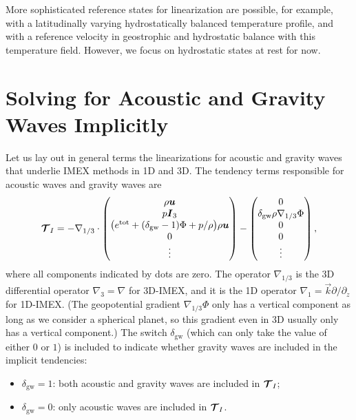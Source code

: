 \documentclass{report}
\begin{document}
More sophisticated reference states for linearization are possible, for example, with a latitudinally varying hydrostatically balanced temperature profile, and with a reference velocity in geostrophic and hydrostatic balance with this temperature field. However, we focus on hydrostatic states at rest for now. 
 
 \section{Solving for Acoustic and Gravity Waves Implicitly}
 \label{s:IMEX_general}

Let us lay out in general terms the linearizations for acoustic and gravity waves that underlie IMEX methods in 1D and 3D. The tendency terms responsible for acoustic waves and gravity waves are
 \begin{equation}
 \boldsymbol{{\mathcal{T}}}_{I}= -\nabla_{1/3} \cdot
 \begin{pmatrix}
 \rho \boldsymbol{{u}} \\
 p \boldsymbol{{I}}_3 \\
 \bigl(e^{\mathrm{tot}} + (\delta_{\mathrm{gw}}-1) \Phi + p/\rho \bigr) \rho \boldsymbol{{u}} \\
 0\\
 \vdots
 \end{pmatrix}
 - \begin{pmatrix}
 0 \\
 \delta_{\mathrm{gw}} \rho \nabla_{1/3} \Phi \\
 0\\
 0\\
 \vdots
 \end{pmatrix},
 \label{eq:3D-imex/tendencies}
 \end{equation}
where all components indicated by dots are zero. The operator $\nabla_{1/3}$ is the 3D differential operator $\nabla_3 = \nabla$ for 3D-IMEX, and it is the 1D operator $\nabla_1 = \vec{k} \partial/\partial_z$ for 1D-IMEX. (The geopotential gradient $\nabla_{1/3} \Phi$ only has a vertical component as long as we consider a spherical planet, so this gradient even in 3D usually only has a vertical component.) The switch $\delta_{\mathrm{gw}}$ (which can only take the value of either $0$ or $1$) is included to indicate whether gravity waves are included in the implicit tendencies: 
\begin{itemize}
    \item $\delta_{\mathrm{gw}}=1$: both acoustic and gravity waves are included in $\boldsymbol{{\mathcal{T}}}_I$;
    \item $\delta_{\mathrm{gw}}=0$: only acoustic waves are included in $\boldsymbol{{\mathcal{T}}}_I$.
\end{itemize}
\end{document}
